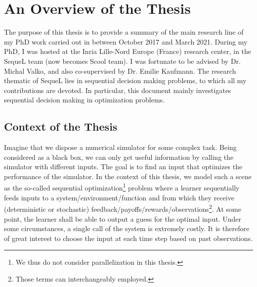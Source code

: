\chapter{An Overview of the Thesis}\label{chap:intro}
	\minitoc
	\newpage





The purpose of this thesis is to provide a summary of the main research line of my PhD work carried out in between October 2017 and March 2021. During my PhD, I was hosted at the Inria Lille-Nord Europe (France) research center, in the SequeL team (now becomes Scool team). I was fortunate to be advised by Dr. Michal Valko, and also co-supervised by Dr. Emilie Kaufmann. The research thematic of SequeL lies in sequential decision making problems, to which all my contributions are devoted. In particular, this document mainly investigates sequential decision making in optimization problems.

\section{Context of the Thesis}\label{sec:intro.context}
	

Imagine that we dispose a numerical simulator for some complex task. Being considered as a black box, we can only get useful information by calling the simulator with different inputs. The goal is to find an input that optimizes the performance of the simulator. In the context of this thesis, we model such a scene as the so-called \gls{sequential optimization}\footnote{We thus do not consider parallelization in this thesis.} problem where a learner sequentially feeds inputs to a system/environment/function and from which they receive (deterministic or stochastic) feedback/payoffs/rewards/observations\footnote{Those terms can interchangeably employed.}. At some point, the learner shall be able to output a guess for the optimal input. Under some circumstances, a single call of the system is extremely costly. It is therefore of great interest to choose the input at each time step based on past observations.

